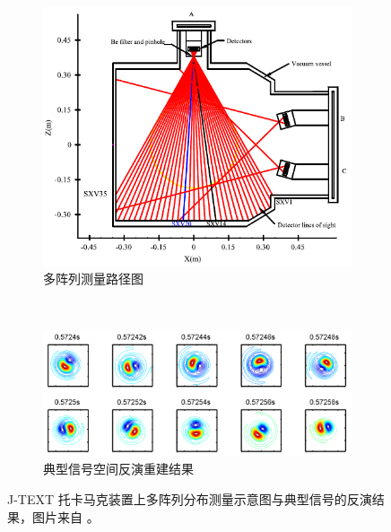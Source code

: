 \begin{figure}[H]
\begin{center}
  \begin{subfigure}{0.5\textwidth}
    \includegraphics[width=\textwidth]{jtext-sxr-a.pdf}
    \caption{多阵列测量路径图}
    \label{fig:chap05:jtext-sxr-a}
  \end{subfigure}
  \\[1em] %
  \begin{subfigure}{\textwidth}
    \includegraphics[width=\textwidth]{jtext-sxr-b.pdf}
    \caption{典型信号空间反演重建结果}
    \label{fig:chap05:jtext-sxr-b}
  \end{subfigure}
  \caption{J-TEXT 托卡马克装置上多阵列分布测量示意图与典型信号的反演结果，图片来自 。}
  \label{fig:chap05:jtext-sxr}
\end{center}
\end{figure}

